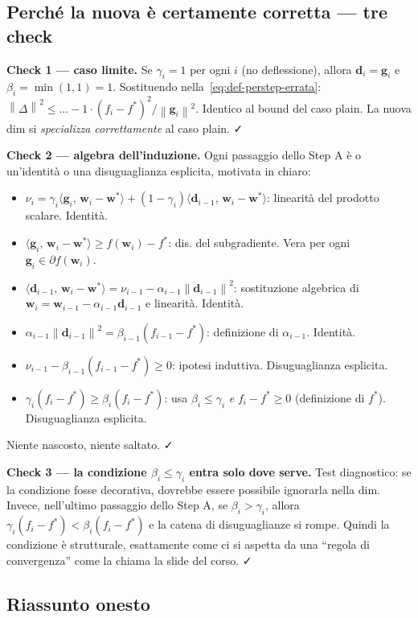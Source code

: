 \documentclass[11pt,a4paper]{article}
\newcommand{\norm}[1]{\left\|#1\right\|}
\newcommand{\inner}[2]{\langle #1,\,#2\rangle}
\newcommand{\bw}{\mathbf{w}}
\newcommand{\bg}{\mathbf{g}}
\newcommand{\bd}{\mathbf{d}}
\theoremstyle{definition}
\begin{document}
\subsection{Perché la nuova è certamente corretta — tre check}

\textbf{Check 1 — caso limite.} Se $\gamma_i = 1$ per ogni $i$ (no deflessione), allora $\bd_i = \bg_i$ e $\beta_i = \min(1,1) = 1$. Sostituendo nella~\eqref{eq:def-perstep-errata}: $\norm{\Delta}^2 \le \dots - 1\cdot(f_i-f^*)^2/\norm{\bg_i}^2$. Identico al bound del caso plain. La nuova dim si \emph{specializza correttamente} al caso plain. ✓

\textbf{Check 2 — algebra dell'induzione.} Ogni passaggio dello Step A è o un'identità o una disuguaglianza esplicita, motivata in chiaro:
\begin{itemize}[leftmargin=*,nosep]
\item $\nu_i = \gamma_i\inner{\bg_i}{\bw_i-\bw^*} + (1-\gamma_i)\inner{\bd_{i-1}}{\bw_i-\bw^*}$: linearità del prodotto scalare. Identità.
\item $\inner{\bg_i}{\bw_i-\bw^*} \ge f(\bw_i)-f^*$: dis. del subgradiente. Vera per ogni $\bg_i \in \partial f(\bw_i)$.
\item $\inner{\bd_{i-1}}{\bw_i-\bw^*} = \nu_{i-1} - \alpha_{i-1}\norm{\bd_{i-1}}^2$: sostituzione algebrica di $\bw_i = \bw_{i-1} - \alpha_{i-1}\bd_{i-1}$ e linearità. Identità.
\item $\alpha_{i-1}\norm{\bd_{i-1}}^2 = \beta_{i-1}(f_{i-1}-f^*)$: definizione di $\alpha_{i-1}$. Identità.
\item $\nu_{i-1} - \beta_{i-1}(f_{i-1}-f^*) \ge 0$: ipotesi induttiva. Disuguaglianza esplicita.
\item $\gamma_i(f_i-f^*) \ge \beta_i(f_i-f^*)$: usa $\beta_i \le \gamma_i$ \emph{e} $f_i-f^*\ge 0$ (definizione di $f^*$). Disuguaglianza esplicita.
\end{itemize}
Niente nascosto, niente saltato. ✓

\textbf{Check 3 — la condizione $\beta_i\le\gamma_i$ entra solo dove serve.} Test diagnostico: se la condizione fosse decorativa, dovrebbe essere possibile ignorarla nella dim. Invece, nell'ultimo passaggio dello Step A, se $\beta_i > \gamma_i$, allora $\gamma_i(f_i-f^*) < \beta_i(f_i-f^*)$ e la catena di disuguaglianze si rompe. Quindi la condizione è strutturale, esattamente come ci si aspetta da una ``regola di convergenza'' come la chiama la slide del corso. ✓

\subsection{Riassunto onesto}
\end{document}
